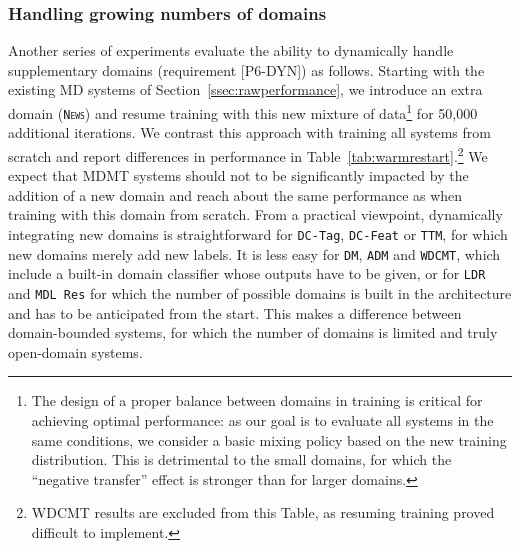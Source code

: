 \documentclass[11pt,a4paper]{article}
\newcommand{\fyDone}[1]{\done[FY]\Todo[FY:]{\textcolor{orange}{#1}}}
\newcommand{\domain}[1]{\texttt{\textsc{#1}}}
\newcommand{\system}[1]{\texttt{{#1}}}
\begin{document}
\subsubsection{Handling growing numbers of domains}
Another series of experiments evaluate the ability to dynamically handle supplementary domains (requirement [P6-DYN]) as follows. Starting with the existing MD systems of Section~\ref{ssec:rawperformance}, we introduce an extra domain (\domain{News}) and resume training with this new mixture of data\footnote{The design of a proper balance between domains in training is critical for achieving optimal performance: as our goal is to evaluate all systems in the same conditions, we consider a basic mixing policy based on the new training distribution. This is detrimental to the small domains, for which the ``negative transfer'' effect is stronger than for larger domains.} for 50,000 additional iterations.\fyDone{Training regime of continuation} We contrast this approach with training all systems from scratch and report differences in performance in Table~\ref{tab:warmrestart}.\footnote{WDCMT results are excluded from this Table, as resuming training proved difficult to implement.}\fyDone{Ecrire un commentaire} 
We expect that MDMT systems should not to be significantly impacted by the addition of a new domain and reach about the same performance as when training with this domain from scratch. From a practical viewpoint, dynamically integrating new domains is straightforward for \system{DC-Tag}, \system{DC-Feat} or \system{TTM}, for which new domains merely add new labels. It is less easy for \system{DM}, \system{ADM} and \system{WDCMT}, which include a built-in domain classifier whose outputs have to be given, or for \system{LDR} and \system{MDL~Res} for which the number of possible domains is built in the architecture and has to be anticipated from the start. This makes a difference between domain-bounded systems, for which the number of domains is limited and truly open-domain systems.%
\end{document}

